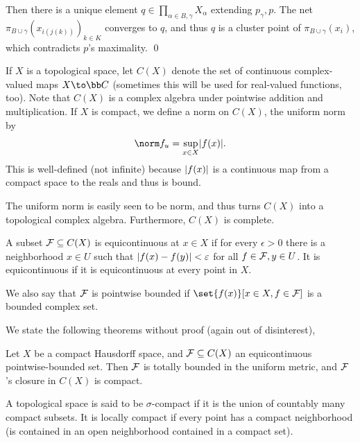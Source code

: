     Then there is a unique element $q\in\prod_{\alpha\in B,\gamma}X_\alpha$ extending $p_\gamma,p$.
    The net $\pi_{B\cup\gamma}(x_{i(j(k))})_{k\in K}$ converges to $q$, and thus $q$ is a cluster point of $\pi_{B\cup\gamma}(x_i)$, which contradicts $p$'s maximality.
    \qed

\eproof

\bdefn

    If $X$ is a topological space, let $C(X)$ denote the set of continuous complex-valued maps $X\to\bC$ (sometimes this will be used for real-valued functions, too).
    Note that $C(X)$ is a complex algebra under pointwise addition and multiplication.
    If $X$ is compact, we define a norm on $C(X)$, the {\emphcolor uniform norm} by
    $$ \norm f_u = \sup_{x\in X}\abs{f(x)} . $$
    This is well-defined (not infinite) because $\mathopen{}\mathclose{\left|f(x)\right|}$ is a continuous map from a compact space to the reals and thus is bound.

\edefn

The uniform norm is easily seen to be norm, and thus turns $C(X)$ into a topological complex algebra.
Furthermore, $C(X)$ is complete.

\bdefn

    A subset ${{\cal F}}\subseteq C(X)$ is {\emphcolor equicontinuous at $x\in X$} if for every $\epsilon>0$ there is a neighborhood $x\in U$
    such that $\mathopen{}\mathclose{\left|f(x)-f(y)\right|}<\varepsilon$ for all $f\in{{\cal F}},y\in U$.
    It is {\emphcolor equicontinuous} if it is equicontinuous at every point in $X$.

    We also say that ${{\cal F}}$ is {\emphcolor pointwise bounded} if $\set{f(x)}[x\in X,f\in\F]$ is a bounded complex set.

\edefn

We state the following theorems without proof (again out of disinterest),

\bthrm[title={Arzela-Ascoli, I}]

    Let $X$ be a compact Hausdorff space, and ${{\cal F}}\subseteq C(X)$ an equicontinuous pointwise-bounded set.
    Then ${{\cal F}}$ is totally bounded in the uniform metric, and ${{\cal F}}$'s closure in $C(X)$ is compact.

\ethrm

\bdefn

    A topological space is said to be {\emphcolor $\sigma$-compact} if it is the union of countably many compact subsets.
    It is {\emphcolor locally compact} if every point has a compact neighborhood (is contained in an open neighborhood contained in a compact set).

